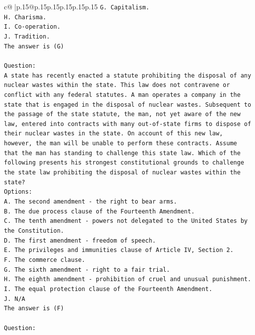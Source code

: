 \documentclass{article}
\begin{document}
{\begin{supertabular}{c@{$\;$}|p{.15\linewidth}@{}p{.15\linewidth}p{.15\linewidth}p{.15\linewidth}p{.15\linewidth}p{.15\linewidth}}
{{{\texttt{G. Capitalism.} \\
\texttt{H. Charisma.} \\
\texttt{I. Co{-}operation.} \\
\texttt{J. Tradition.} \\
\texttt{The answer is (G)} \\
\\ 
\texttt{Question:} \\
\texttt{A state has recently enacted a statute prohibiting the disposal of any nuclear wastes within the state. This law does not contravene or conflict with any federal statutes. A man operates a company in the state that is engaged in the disposal of nuclear wastes. Subsequent to the passage of the state statute, the man, not yet aware of the new law, entered into contracts with many out{-}of{-}state firms to dispose of their nuclear wastes in the state. On account of this new law, however, the man will be unable to perform these contracts. Assume that the man has standing to challenge this state law. Which of the following presents his strongest constitutional grounds to challenge the state law prohibiting the disposal of nuclear wastes within the state?} \\
\texttt{Options:} \\
\texttt{A. The second amendment {-} the right to bear arms.} \\
\texttt{B. The due process clause of the Fourteenth Amendment.} \\
\texttt{C. The tenth amendment {-} powers not delegated to the United States by the Constitution.} \\
\texttt{D. The first amendment {-} freedom of speech.} \\
\texttt{E. The privileges and immunities clause of Article IV, Section 2.} \\
\texttt{F. The commerce clause.} \\
\texttt{G. The sixth amendment {-} right to a fair trial.} \\
\texttt{H. The eighth amendment {-} prohibition of cruel and unusual punishment.} \\
\texttt{I. The equal protection clause of the Fourteenth Amendment.} \\
\texttt{J. N/A} \\
\texttt{The answer is (F)} \\
\\ 
\texttt{Question:} \\
}}}
\end{supertabular}}
\end{document}
